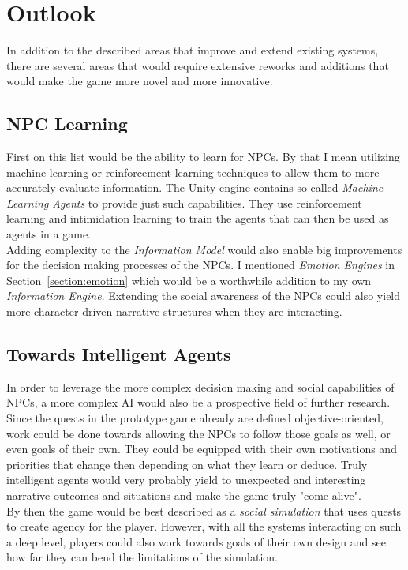 \section{Outlook}
In addition to the described areas that improve and extend existing systems, there are several areas that would require extensive reworks and additions that would make the game more novel and more innovative.
\subsection{NPC Learning}
First on this list would be the ability to learn for NPCs. By that I mean utilizing machine learning or reinforcement learning techniques to allow them to more accurately evaluate information. The Unity engine contains so-called \textit{Machine Learning Agents} to provide just such capabilities. They use reinforcement learning and intimidation learning to train the agents that can then be used as agents in a game.\\
Adding complexity to the \textit{Information Model} would also enable big improvements for the decision making processes of the NPCs. I mentioned \textit{Emotion Engines} in Section~\ref{section:emotion} which would be a worthwhile addition to my own \textit{Information Engine}. Extending the social awareness of the NPCs could also yield more character driven narrative structures when they are interacting.
\subsection{Towards Intelligent Agents}
In order to leverage the more complex decision making and social capabilities of NPCs, a more complex AI would also be a prospective field of further research. Since the quests in the prototype game already are defined objective-oriented, work could be done towards allowing the NPCs to follow those goals as well, or even goals of their own. They could be equipped with their own motivations and priorities that change then depending on what they learn or deduce. Truly intelligent agents would very probably yield to unexpected and interesting narrative outcomes and situations and make the game truly "come alive".\\
By then the game would be best described as a \textit{social simulation} that uses quests to create agency for the player. However, with all the systems interacting on such a deep level, players could also work towards goals of their own design and see how far they can bend the limitations of the simulation.
